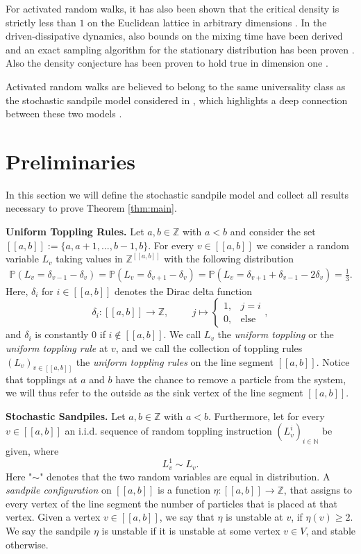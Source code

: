 \documentclass[11pt]{article}
\newcommand{\N}{\mathbb{N}}
\newcommand{\Z}{\mathbb{Z}}
\newcommand{\prob}{\mathbb{P}}
\begin{document}
For activated random walks, it has also been shown that the critical density is strictly less than $1$ on the Euclidean lattice in arbitrary dimensions \cite{AFG24}. In the driven-dissipative dynamics, also bounds on the mixing time have been derived and an exact sampling algorithm for the stationary distribution has been proven \cite{LL24}. Also the density conjecture has been proven to hold true in dimension one \cite{HJJ24}.

Activated random walks are believed to belong to the same universality class as the stochastic sandpile model considered in \cite{HHRR22,CFT24}, which highlights a deep connection between these two models \cite{L04}.
\section{Preliminaries}\label{sec:prelim}
In this section we will define the stochastic sandpile model and collect all results necessary to prove Theorem \ref{thm:main}.

\textbf{Uniform Toppling Rules.} Let $a,b\in\Z$ with $a<b$ and consider the set $[[a,b]]:=\{a,a+1,...,b-1,b\}$. For every $v\in[[a,b]]$ we consider a random variable $L_v$ taking values in $\Z^{[[a,b]]}$ with the following distribution
\begin{align*}
    \prob(L_v=\delta_{v-1}-\delta_v)=\prob(L_v=\delta_{v+1}-\delta_v)=\prob(L_v=\delta_{v+1}+\delta_{v-1}-2\delta_v)=\frac{1}{3}.
\end{align*}
Here, $\delta_i$ for $i\in[[a,b]]$ denotes the Dirac delta function
$$\delta_i:[[a,b]]\rightarrow\Z,\hspace{1cm}j\mapsto\begin{cases}
    1,&j=i\\
    0,&\text{else}
\end{cases},$$
and $\delta_i$ is constantly $0$ if $i\notin[[a,b]].$ We call $L_v$ the {\it uniform toppling} or the {\it uniform toppling rule} at $v$, and we call the collection of toppling rules $(L_v)_{v\in[[a,b]]}$ the {\it uniform toppling rules} on the line segment $[[a,b]]$. Notice that topplings at $a$ and $b$ have the chance to remove a particle from the system, we will thus refer to the outside as the sink vertex of the line segment $[[a,b]].$

\textbf{Stochastic Sandpiles.} Let $a,b\in\Z$ with $a<b$. Furthermore, let for every $v\in[[a,b]]$ an i.i.d. sequence of random toppling instruction $(L_v^i)_{i\in\N}$ be given, where
$$L_v^1\sim L_v.$$
Here "$\sim$" denotes that the two random variables are equal in distribution. A {\it sandpile configuration} on $[[a,b]]$ is a function $\eta:[[a,b]]\rightarrow\Z$, that assigns to every vertex of the line segment the number of particles that is placed at that vertex. Given a vertex $v\in[[a,b]]$, we say that $\eta$ is unstable at $v$, if $\eta(v)\geq 2$. We say the sandpile $\eta$ is unstable if it is unstable at some vertex $v\in V$, and stable otherwise.
\end{document}
